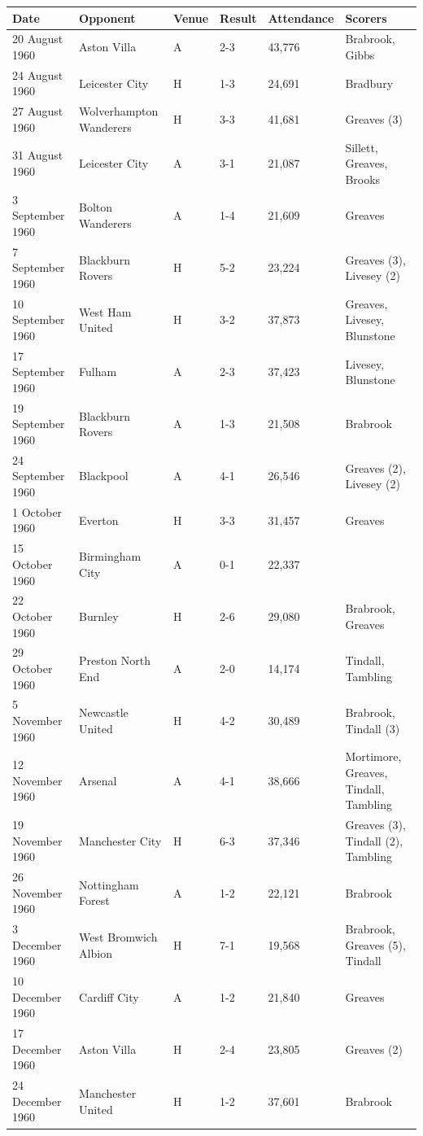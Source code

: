 \documentclass{article}
\begin{document}
\begin{tabular}{llllll}
\toprule
Date & Opponent & Venue & Result & Attendance & Scorers \\
\midrule
20 August 1960 & Aston Villa & A & 2-3 & 43,776 & Brabrook, Gibbs \\
24 August 1960 & Leicester City & H & 1-3 & 24,691 & Bradbury \\
27 August 1960 & Wolverhampton Wanderers & H & 3-3 & 41,681 & Greaves (3) \\
31 August 1960 & Leicester City & A & 3-1 & 21,087 & Sillett, Greaves, Brooks \\
3 September 1960 & Bolton Wanderers & A & 1-4 & 21,609 & Greaves \\
7 September 1960 & Blackburn Rovers & H & 5-2 & 23,224 & Greaves (3), Livesey (2) \\
10 September 1960 & West Ham United & H & 3-2 & 37,873 & Greaves, Livesey, Blunstone \\
17 September 1960 & Fulham & A & 2-3 & 37,423 & Livesey, Blunstone \\
19 September 1960 & Blackburn Rovers & A & 1-3 & 21,508 & Brabrook \\
24 September 1960 & Blackpool & A & 4-1 & 26,546 & Greaves (2), Livesey (2) \\
1 October 1960 & Everton & H & 3-3 & 31,457 & Greaves \\
15 October 1960 & Birmingham City & A & 0-1 & 22,337 &  \\
22 October 1960 & Burnley & H & 2-6 & 29,080 & Brabrook, Greaves \\
29 October 1960 & Preston North End & A & 2-0 & 14,174 & Tindall, Tambling \\
5 November 1960 & Newcastle United & H & 4-2 & 30,489 & Brabrook, Tindall (3) \\
12 November 1960 & Arsenal & A & 4-1 & 38,666 & Mortimore, Greaves, Tindall, Tambling \\
19 November 1960 & Manchester City & H & 6-3 & 37,346 & Greaves (3), Tindall (2), Tambling \\
26 November 1960 & Nottingham Forest & A & 1-2 & 22,121 & Brabrook \\
3 December 1960 & West Bromwich Albion & H & 7-1 & 19,568 & Brabrook, Greaves (5), Tindall \\
10 December 1960 & Cardiff City & A & 1-2 & 21,840 & Greaves \\
17 December 1960 & Aston Villa & H & 2-4 & 23,805 & Greaves (2) \\
24 December 1960 & Manchester United & H & 1-2 & 37,601 & Brabrook \\

\end{tabular}
\end{document}
